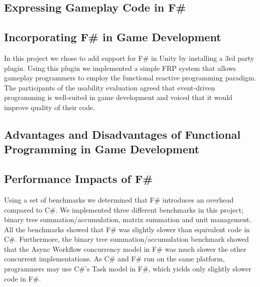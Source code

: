 \subsection{Expressing Gameplay Code in F\#}

\subsection{Incorporating F\# in Game Development}
In this project we chose to add support for F\# in Unity by installing a 3rd party plugin. Using this plugin we implemented a simple \gls{FRP} system that allows gameplay programmers to employ the functional reactive programming paradigm. The participants of the usability evaluation agreed that event-driven programming is well-suited in game development and voiced that it would improve quality of their code.

\subsection{Advantages and Disadvantages of Functional Programming in Game Development}


\subsection{Performance Impacts of F\#}
Using a set of benchmarks we determined that F\# introduces an overhead compared to C\#. We implemented three different benchmarks in this project; binary tree summation/accumulation, matrix summation and unit management. All the benchmarks showed that F\# was slightly slower than equivalent code in C\#. Furthermore, the binary tree summation/accumulation benchmark showed that the Async Workflow concurrency model in F\# was much slower the other concurrent implementations. As C\# and F\# run on the same platform, programmers may use C\#'s Task model in F\#, which yields only slightly slower code in F\#.